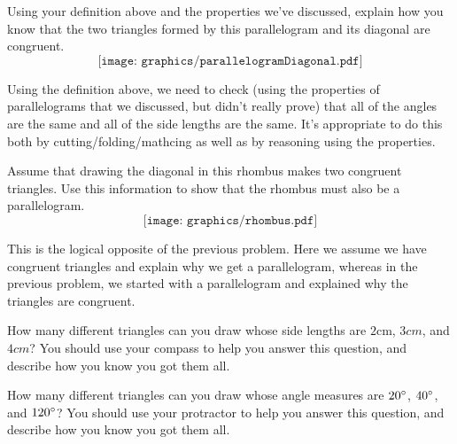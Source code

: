 \documentclass[nooutcomes]{ximera}
\begin{document}
\begin{problem}
Using your definition above and the properties we've discussed, explain how you know that the two triangles formed by this parallelogram and its diagonal are congruent.
\[
\texttt{[image: graphics/parallelogramDiagonal.pdf]}
\]

\begin{instructorNotes}
Using the definition above, we need to check (using the properties of parallelograms that we discussed, but didn't really prove) that all of the angles are the same and all of the side lengths are the same.  It's appropriate to do this both by cutting/folding/mathcing as well as by reasoning using the properties.
\end{instructorNotes}
\end{problem}

\begin{problem}
Assume that drawing the diagonal in this rhombus makes two congruent triangles.  Use this information to show that the rhombus must also be a parallelogram.
\[
\texttt{[image: graphics/rhombus.pdf]}
\]

\begin{instructorNotes}
This is the logical opposite of the previous problem.  Here we assume we have congruent triangles and explain why we get a parallelogram, whereas in the previous problem, we started with a parallelogram and explained why the triangles are congruent.
\end{instructorNotes}
\end{problem}

\begin{problem}
How many different triangles can you draw whose side lengths are $2$cm, $3cm$, and $4cm$?  You should use your compass to help you answer this question, and describe how you know you got them all.
\end{problem}

\begin{problem}
How many different triangles can you draw whose angle measures are $20\degree$, $40\degree$, and $120\degree$?  You should use your protractor to help you answer this question, and describe how you know you got them all.
\end{problem}
\end{document}

